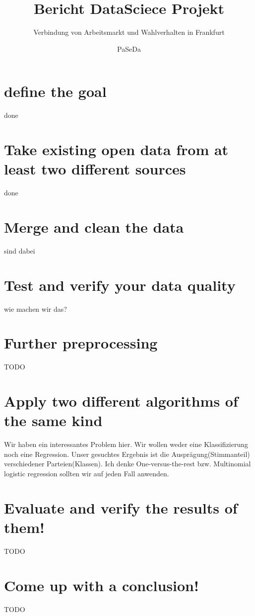 \documentclass[a4paper,10pt]{scrartcl}
\title{\vspace{-2cm}Bericht DataSciece Projekt}
\subtitle{Verbindung von Arbeitsmarkt und Wahlverhalten in Frankfurt}
\author{PaSeDa}
\date{}
\begin{document}
\maketitle

\section{define the goal}
done

\section{Take existing open data from at least two different sources}
done

\section{Merge and clean the data}
sind dabei
\section{Test and verify your data quality}
wie machen wir das?
\section{Further preprocessing}
TODO
\section{Apply two different algorithms of the same kind}
Wir haben ein interessantes Problem hier. Wir wollen weder eine Klassifizierung noch eine Regression. Unser gesuchtes Ergebnis ist die Ausprägung(Stimmanteil) verschiedener Parteien(Klassen). Ich denke One-versus-the-rest bzw. Multinomial logistic regression sollten wir auf jeden Fall anwenden.

\section{Evaluate and verify the results of them!}
TODO
\section{Come up with a conclusion!}
TODO
\end{document}
